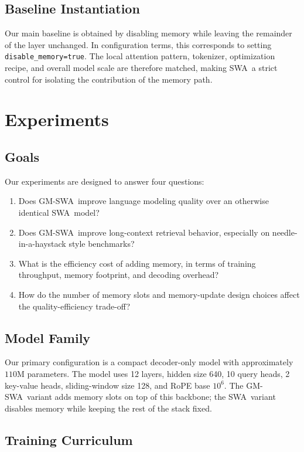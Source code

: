 \documentclass{article}
\newcommand{\model}{GM-SWA}
\newcommand{\baseline}{SWA}
\begin{document}
\subsection{Baseline Instantiation}

Our main baseline is obtained by disabling memory while leaving the remainder of the layer unchanged. In configuration terms, this corresponds to setting \texttt{disable\_memory=true}. The local attention pattern, tokenizer, optimization recipe, and overall model scale are therefore matched, making \baseline\ a strict control for isolating the contribution of the memory path.

\section{Experiments}

\subsection{Goals}

Our experiments are designed to answer four questions:
\begin{enumerate}
    \item Does \model\ improve language modeling quality over an otherwise identical \baseline\ model?
    \item Does \model\ improve long-context retrieval behavior, especially on needle-in-a-haystack style benchmarks?
    \item What is the efficiency cost of adding memory, in terms of training throughput, memory footprint, and decoding overhead?
    \item How do the number of memory slots and memory-update design choices affect the quality-efficiency trade-off?
\end{enumerate}

\subsection{Model Family}

Our primary configuration is a compact decoder-only model with approximately $110$M parameters. The model uses 12 layers, hidden size 640, 10 query heads, 2 key-value heads, sliding-window size 128, and RoPE base $10^6$. The \model\ variant adds memory slots on top of this backbone; the \baseline\ variant disables memory while keeping the rest of the stack fixed.

\subsection{Training Curriculum}
\end{document}
